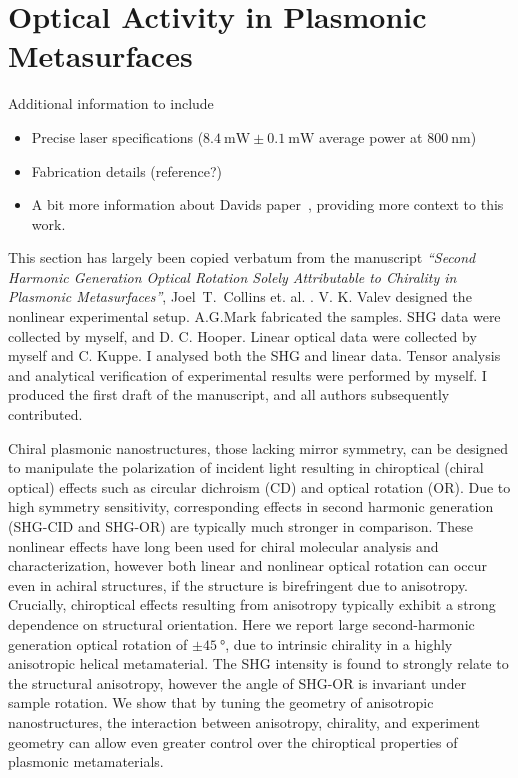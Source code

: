 \chapter{Optical Activity in Plasmonic Metasurfaces}\label{sec:results:OAinPlanarNanohelices}

\color{red}
Additional information to include
\begin{itemize}
    \item Precise laser specifications ($\SI{8.4}{\milli\watt}\pm\SI{0.1}{\milli\watt}$ average power at $\SI{800}{\nano\m}$)
    \item Fabrication details (reference?)
    \item A bit more information about Davids paper~\cite{Hooper2017}, providing more context to this work.
\end{itemize}
\color{black}

This section has largely been copied verbatum from the manuscript \textit{``Second Harmonic Generation Optical Rotation Solely Attributable to Chirality in Plasmonic Metasurfaces''}, Joel~T.~Collins et. al. \cite{Collins2018b}.
V. K. Valev designed the nonlinear experimental setup. A.G.Mark fabricated the samples. SHG data were collected by myself, and D. C. Hooper. Linear optical data were collected by myself and C. Kuppe. I analysed both the SHG and linear data. Tensor analysis and analytical verification of experimental results were performed by myself. I produced the first draft of the manuscript, and all authors subsequently contributed.

\bigskip \noindent
Chiral plasmonic nanostructures, those lacking mirror symmetry, can be designed to manipulate the polarization of incident light resulting in chiroptical (chiral optical) effects such as circular dichroism (CD) and optical rotation (OR). Due to high symmetry sensitivity, corresponding effects in second harmonic generation (SHG-CID and SHG-OR) are typically much stronger in comparison. These nonlinear effects have long been used for chiral molecular analysis and characterization, however both linear and nonlinear optical rotation can occur even in achiral structures, if the structure is birefringent due to anisotropy. Crucially, chiroptical effects resulting from anisotropy typically exhibit a strong dependence on structural orientation. Here we report large second-harmonic generation optical rotation of $\pm\SI{45}{\degree}$, due to intrinsic chirality in a highly anisotropic helical metamaterial. The SHG intensity is found to strongly relate to the structural anisotropy, however the angle of SHG-OR is invariant under sample rotation. We show that by tuning the geometry of anisotropic nanostructures, the interaction between anisotropy, chirality, and experiment geometry can allow even greater control over the chiroptical properties of plasmonic metamaterials.

